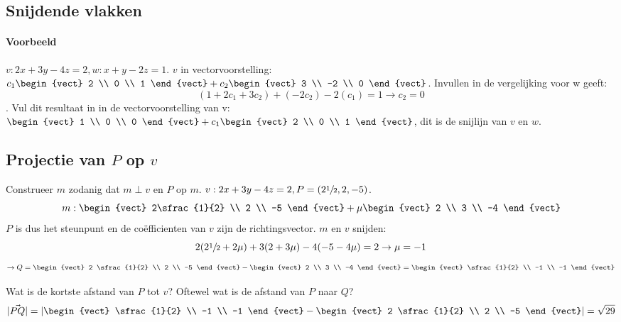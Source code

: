 \subsection{Snijdende vlakken}
\paragraph{Voorbeeld} $v: 2x + 3y - 4z = 2, w: x+y-2z=1$. $v$ in vectorvoorstelling: $c_1 \begin{vect} 2 \\ 0 \\ 1 \end{vect} + c_2 \begin{vect} 3 \\ -2 \\ 0 \end{vect}$. Invullen in de vergelijking voor w geeft:
\[ (1 + 2c_1 + 3c_2) + (-2c_2) -2(c_1) = 1 \to c_2 = 0 \].
Vul dit resultaat in in de vectorvoorstelling van v: $\begin{vect} 1 \\ 0 \\ 0 \end{vect} + c_1 \begin{vect} 2 \\ 0 \\ 1 \end{vect}$, dit is de snijlijn van $v$ en $w$.

\subsection{Projectie van $P$ op $v$}
Construeer $m$ zodanig dat $m \perp v$ en $P$ op $m$. $v: 2x+3y-4z =2, P = (2\sfrac{1}{2}, 2, -5)$.
\[ m: \begin{vect} 2\sfrac{1}{2} \\ 2 \\ -5 \end{vect} + \mu \begin{vect} 2 \\ 3 \\ -4 \end{vect} \]
$P$ is dus het steunpunt en de co\"efficienten van $v$ zijn de richtingsvector. $m$ en $v$ snijden:
\[ 2(2 \sfrac{1}{2} + 2 \mu) + 3(2+3\mu) -4(-5 -4\mu)=2 \to \mu=-1 \]
\[ \to Q = \begin{vect} 2 \sfrac{1}{2} \\ 2 \\ -5 \end{vect} - \begin{vect} 2 \\ 3 \\ -4 \end{vect} = \begin{vect} \sfrac{1}{2} \\ -1 \\ -1 \end{vect} \]

Wat is de kortste afstand van $P$ tot $v$? Oftewel wat is de afstand van $P$ naar $Q$?
\[ |\vec{PQ}| = \left| \begin{vect} \sfrac{1}{2} \\ -1 \\ -1 \end{vect} - \begin{vect} 2 \sfrac{1}{2} \\ 2 \\ -5 \end{vect} \right| = \sqrt{29} \]
